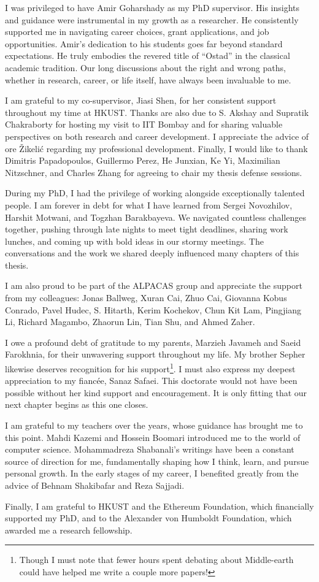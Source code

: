 I was privileged to have Amir Goharshady as my PhD supervisor. His insights and guidance were instrumental in my growth as a researcher. He consistently supported me in navigating career choices, grant applications, and job opportunities.
Amir’s dedication to his students goes far beyond standard expectations. He truly embodies the revered title of ``Ostad'' in the classical academic tradition.
Our long discussions about the right and wrong paths, whether in research, career, or life itself, have always been invaluable to me.

I am grateful to my co-supervisor, Jiasi Shen, for her consistent support throughout my time at HKUST. Thanks are also due to S. Akshay and Supratik Chakraborty for hosting my visit to IIT Bombay and for sharing valuable perspectives on both research and career development. I appreciate the advice of \DJ or\dj e \v{Z}ikeli\'{c} regarding my professional development. Finally, I would like to thank Dimitris Papadopoulos, Guillermo Perez, He Junxian, Ke Yi, Maximilian Nitzschner, and Charles Zhang for agreeing to chair my thesis defense sessions.

During my PhD, I had the privilege of working alongside exceptionally talented people. I am forever in debt for what I have learned from Sergei Novozhilov, Harshit Motwani, and Togzhan Barakbayeva. We navigated countless challenges together, pushing through late nights to meet tight deadlines, sharing work lunches, and coming up with bold ideas in our stormy meetings. The conversations and the work we shared deeply influenced many chapters of this thesis.

I am also proud to be part of the ALPACAS group and appreciate the support from my colleagues: Jonas Ballweg, Xuran Cai, Zhuo Cai, Giovanna Kobus Conrado, Pavel Hudec, S. Hitarth, Kerim Kochekov, Chun Kit Lam, Pingjiang Li, Richard Magambo, Zhaorun Lin, Tian Shu, and Ahmed Zaher.

I owe a profound debt of gratitude to my parents, Marzieh Javameh and Saeid Farokhnia, for their unwavering support throughout my life. My brother Sepher likewise deserves recognition for his support\footnote{Though I must note that fewer hours spent debating about Middle-earth could have helped me write a couple more papers!}.
I must also express my deepest appreciation to my fianc\'ee, Sanaz Safaei. This doctorate would not have been possible without her kind support and encouragement. It is only fitting that our next chapter begins as this one closes.

I am grateful to my teachers over the years, whose guidance has brought me to this point. Mahdi Kazemi and Hossein Boomari introduced me to the world of computer science.
Mohammadreza Shabanali’s writings have been a constant source of direction for me, fundamentally shaping how I think, learn, and pursue personal growth.
In the early stages of my career, I benefited greatly from the advice of Behnam Shakibafar and Reza Sajjadi.

Finally, I am grateful to HKUST and the Ethereum Foundation, which financially supported my PhD, and to the Alexander von Humboldt Foundation, which awarded me a research fellowship.